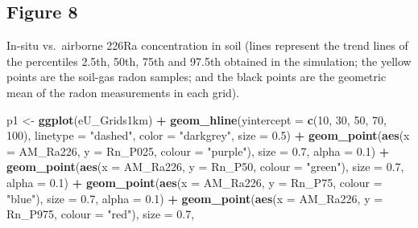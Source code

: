 \documentclass[
  12pt,
]{article}
\newenvironment{Shaded}{\begin{snugshade}}{\end{snugshade}}
\newcommand{\DataTypeTok}[1]{\textcolor[rgb]{0.13,0.29,0.53}{#1}}
\newcommand{\DecValTok}[1]{\textcolor[rgb]{0.00,0.00,0.81}{#1}}
\newcommand{\FloatTok}[1]{\textcolor[rgb]{0.00,0.00,0.81}{#1}}
\newcommand{\KeywordTok}[1]{\textcolor[rgb]{0.13,0.29,0.53}{\textbf{#1}}}
\newcommand{\NormalTok}[1]{#1}
\newcommand{\OperatorTok}[1]{\textcolor[rgb]{0.81,0.36,0.00}{\textbf{#1}}}
\newcommand{\StringTok}[1]{\textcolor[rgb]{0.31,0.60,0.02}{#1}}
\begin{document}
\hypertarget{figure-8}{%
\subsection{Figure 8}\label{figure-8}}

In-situ vs.~airborne 226Ra concentration in soil (lines represent the
trend lines of the percentiles 2.5th, 50th, 75th and 97.5th obtained in
the simulation; the yellow points are the soil-gas radon samples; and
the black points are the geometric mean of the radon measurements in
each grid).

\begin{Shaded}
\begin{Highlighting}[]
\NormalTok{  p1 \textless{}{-}}\StringTok{ }\KeywordTok{ggplot}\NormalTok{(eU\_Grids1km) }\OperatorTok{+}
\StringTok{  }\KeywordTok{geom\_hline}\NormalTok{(}\DataTypeTok{yintercept =} \KeywordTok{c}\NormalTok{(}\DecValTok{10}\NormalTok{, }\DecValTok{30}\NormalTok{, }\DecValTok{50}\NormalTok{, }\DecValTok{70}\NormalTok{, }\DecValTok{100}\NormalTok{),}
             \DataTypeTok{linetype =} \StringTok{"dashed"}\NormalTok{, }\DataTypeTok{color =} \StringTok{"darkgrey"}\NormalTok{, }\DataTypeTok{size =} \FloatTok{0.5}\NormalTok{) }\OperatorTok{+}
\StringTok{  }\KeywordTok{geom\_point}\NormalTok{(}\KeywordTok{aes}\NormalTok{(}\DataTypeTok{x =}\NormalTok{ AM\_Ra226, }\DataTypeTok{y =}\NormalTok{ Rn\_P025, }\DataTypeTok{colour =} \StringTok{"purple"}\NormalTok{),}
             \DataTypeTok{size =} \FloatTok{0.7}\NormalTok{,}
             \DataTypeTok{alpha =} \FloatTok{0.1}\NormalTok{) }\OperatorTok{+}
\StringTok{  }\KeywordTok{geom\_point}\NormalTok{(}\KeywordTok{aes}\NormalTok{(}\DataTypeTok{x =}\NormalTok{ AM\_Ra226, }\DataTypeTok{y =}\NormalTok{ Rn\_P50, }\DataTypeTok{colour =} \StringTok{"green"}\NormalTok{),}
             \DataTypeTok{size =} \FloatTok{0.7}\NormalTok{,}
             \DataTypeTok{alpha =} \FloatTok{0.1}\NormalTok{) }\OperatorTok{+}
\StringTok{  }\KeywordTok{geom\_point}\NormalTok{(}\KeywordTok{aes}\NormalTok{(}\DataTypeTok{x =}\NormalTok{ AM\_Ra226, }\DataTypeTok{y =}\NormalTok{ Rn\_P75, }\DataTypeTok{colour =} \StringTok{"blue"}\NormalTok{),}
             \DataTypeTok{size =} \FloatTok{0.7}\NormalTok{,}
             \DataTypeTok{alpha =} \FloatTok{0.1}\NormalTok{) }\OperatorTok{+}
\StringTok{  }\KeywordTok{geom\_point}\NormalTok{(}\KeywordTok{aes}\NormalTok{(}\DataTypeTok{x =}\NormalTok{ AM\_Ra226, }\DataTypeTok{y =}\NormalTok{ Rn\_P975, }\DataTypeTok{colour =} \StringTok{"red"}\NormalTok{),}
             \DataTypeTok{size =} \FloatTok{0.7}\NormalTok{,}

\end{Highlighting}
\end{Shaded}
\end{document}
